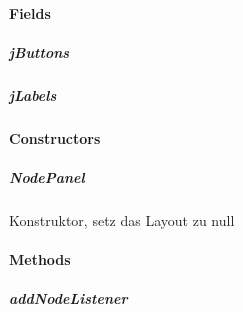 \documentclass[letterpaper,10pt,ngerman]{sphinxmanual}
\begin{document}
\paragraph{Fields}
\label{\detokenize{com/linuxluigi/edu/view/NodePanel:fields}}

\subparagraph{jButtons}
\label{\detokenize{com/linuxluigi/edu/view/NodePanel:jbuttons}}

\begin{fulllineitems}
\label{\detokenize{com/linuxluigi/edu/view/NodePanel:com.linuxluigi.edu.view.NodePanel.jButtons}}
\end{fulllineitems}



\subparagraph{jLabels}
\label{\detokenize{com/linuxluigi/edu/view/NodePanel:jlabels}}

\begin{fulllineitems}
\label{\detokenize{com/linuxluigi/edu/view/NodePanel:com.linuxluigi.edu.view.NodePanel.jLabels}}
\end{fulllineitems}



\paragraph{Constructors}
\label{\detokenize{com/linuxluigi/edu/view/NodePanel:constructors}}

\subparagraph{NodePanel}
\label{\detokenize{com/linuxluigi/edu/view/NodePanel:id1}}

\begin{fulllineitems}
\label{\detokenize{com/linuxluigi/edu/view/NodePanel:com.linuxluigi.edu.view.NodePanel.NodePanel()}}
Konstruktor, setz das Layout zu null

\end{fulllineitems}



\paragraph{Methods}
\label{\detokenize{com/linuxluigi/edu/view/NodePanel:methods}}

\subparagraph{addNodeListener}
\label{\detokenize{com/linuxluigi/edu/view/NodePanel:addnodelistener}}
\end{document}
